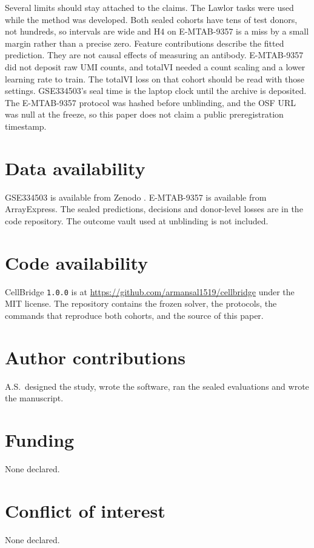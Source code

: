 \documentclass[10pt,a4paper]{article}
\begin{document}
Several limits should stay attached to the claims. The Lawlor tasks were used while the method was developed. Both sealed cohorts have tens of test donors, not hundreds, so intervals are wide and H4 on E-MTAB-9357 is a miss by a small margin rather than a precise zero. Feature contributions describe the fitted prediction. They are not causal effects of measuring an antibody. E-MTAB-9357 did not deposit raw UMI counts, and totalVI needed a count scaling and a lower learning rate to train. The totalVI loss on that cohort should be read with those settings. GSE334503's seal time is the laptop clock until the archive is deposited. The E-MTAB-9357 protocol was hashed before unblinding, and the OSF URL was null at the freeze, so this paper does not claim a public preregistration timestamp.

\section*{Data availability}
GSE334503 is available from Zenodo \citep{savi2026}. E-MTAB-9357 is available from ArrayExpress. The sealed predictions, decisions and donor-level losses are in the code repository. The outcome vault used at unblinding is not included.

\section*{Code availability}
CellBridge \texttt{1.0.0} is at \url{https://github.com/armansal1519/cellbridge} under the MIT license. The repository contains the frozen solver, the protocols, the commands that reproduce both cohorts, and the source of this paper.

\section*{Author contributions}
A.S.\ designed the study, wrote the software, ran the sealed evaluations and wrote the manuscript.

\section*{Funding}
None declared.

\section*{Conflict of interest}
None declared.



\end{document}

